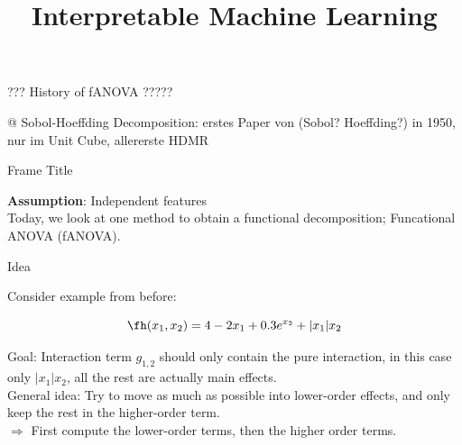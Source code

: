 \documentclass[11pt,compress,t,notes=noshow, aspectratio=169, xcolor=table]{beamer}
\title{Interpretable Machine Learning}
\date{}
\begin{document}
\newcommand{\titlefigure}{figure/open_blackbox}
\newcommand{\learninggoals}{
\item Understand one classical kind of functional decomposition: functional ANOVA (fANOVA).
\item [...]
\item Algorithm for calculating the components in a fANOVA}


\begin{frame}{??? History of fANOVA ?????}

@ Sobol-Hoeffding Decomposition: erstes Paper von (Sobol? Hoeffding?) in 1950, nur im Unit Cube, allererste HDMR
    
\end{frame}

\begin{frame}{Frame Title}

    \textbf{Assumption}: Independent features \\
    Today, we look at one method to obtain a functional decomposition; Funcational ANOVA (fANOVA).
    
\end{frame}

\begin{frame}{Idea}

    Consider example from before:

    \begin{equation}
        \fh(x_1, x_2) = 4 - 2x_1 + 0.3 e^{x_2} + |x_1|x_2
    \end{equation}

    Goal: Interaction term \(g_{1,2}\) should only contain the pure interaction, in this case only \(|x_1|x_2\), all the rest are actually main effects. \\
    General idea: Try to move as much as possible into lower-order effects, and only keep the rest in the higher-order term. \\
    \(\Rightarrow\) First compute the lower-order terms, then the higher order terms.
    
\end{frame}
\end{document}
